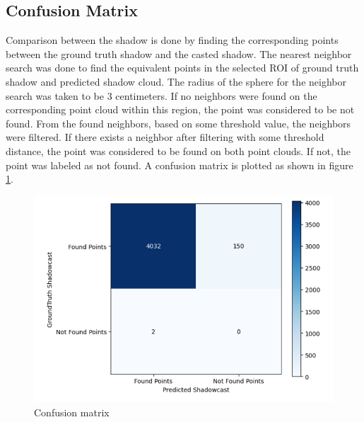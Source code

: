 \subsection{Confusion Matrix}
Comparison between the shadow is done by finding the corresponding points between the ground truth shadow and the casted shadow. The nearest neighbor search was done to find the equivalent points in the selected ROI of ground truth shadow and predicted shadow cloud. The radius of the sphere for the neighbor search was taken to be 3 centimeters. If no neighbors were found on the corresponding point cloud within this region, the point was considered to be not found. From the found neighbors, based on some threshold value, the neighbors were filtered. If there exists a neighbor after filtering with some threshold distance, the point was considered to be found on both point clouds. If not, the point was labeled as not found. A confusion matrix is plotted as shown in figure \ref{fig:evaluation_cm}.


\begin{figure}[htbp]
    \centering
    \includegraphics[width=1\linewidth]{97_graphics/evaluation/cm_shadowcast.pdf}
    \caption{Confusion matrix}
    \label{fig:evaluation_cm}
\end{figure}

